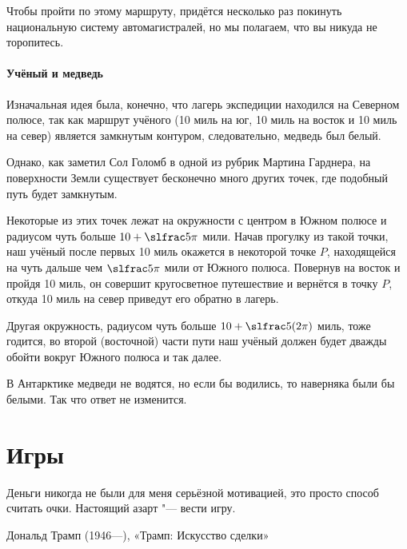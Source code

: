 \documentclass[twoside]{book}
\begin{document}
Чтобы пройти по этому маршруту, придётся несколько раз 
покинуть национальную систему автомагистралей, но мы полагаем, что вы никуда не торопитесь.

\subsubsection*{Учёный и медведь}%

Изначальная идея была, конечно, что лагерь экспедиции находился на Северном полюсе, так как маршрут учёного (10 миль на юг, 10 миль на восток и 10 миль на север) является замкнутым контуром, %
следовательно, медведь был белый.

Однако, как заметил Сол Голомб в одной из рубрик %
Мартина Гарднера, %
на поверхности Земли существует бесконечно много других точек, где подобный путь будет замкнутым.

Некоторые из этих точек лежат на окружности с центром в Южном полюсе и радиусом чуть больше $10 + \slfrac5\pi$ мили.
Начав прогулку из такой точки, наш учёный после первых 10 миль окажется в некоторой точке $P$, 
находящейся на чуть дальше чем $\slfrac5\pi$ мили от Южного полюса.
Повернув на восток и пройдя 10 миль, он совершит кругосветное путешествие и вернётся в точку $P$, откуда 10 миль на север приведут его обратно в лагерь.

Другая окружность, радиусом чуть больше $10 + \slfrac5{(2\pi)}$ миль, тоже годится, во второй (восточной) части пути наш учёный должен будет дважды обойти вокруг Южного полюса и так далее.

В Антарктике медведи не водятся, но если бы водились, то наверняка были бы белыми.
Так что ответ не изменится.\heart


\chapter{Игры}

\setlength{\epigraphwidth}{.66\textwidth}
\epigraph{Деньги никогда не были для меня серьёзной мотивацией, это просто способ считать очки.
Настоящий азарт "--- вести игру.\vspace{1ex}}{Дональд Трамп (1946---),
«Трамп: Искусство сделки»}
\end{document}
